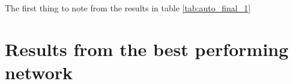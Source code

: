     The first thing to note from the results in table \ref{tab:auto_final_1}
    \newpage

    \newpage
    \section{Results from the best performing network}
